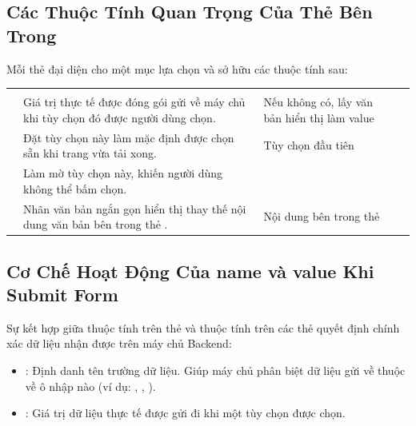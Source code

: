 \subsection{Các Thuộc Tính Quan Trọng Của Thẻ  Bên Trong}

Mỗi thẻ  đại diện cho một mục lựa chọn và sở hữu các thuộc tính sau:

\begin{prettyTableBox}
\begin{tabularx}{\linewidth}{K{2.4cm} Z K{2.2cm} Z}
 &  &  &  \\
 & Giá trị thực tế được đóng gói gửi về máy chủ khi tùy chọn đó được người dùng chọn. & Nếu không có, lấy văn bản hiển thị làm value &  \\
 & Đặt tùy chọn này làm mặc định được chọn sẵn khi trang vừa tải xong. & Tùy chọn đầu tiên &  \\
 & Làm mờ tùy chọn này, khiến người dùng không thể bấm chọn. &  &  \\
 & Nhãn văn bản ngắn gọn hiển thị thay thế nội dung văn bản bên trong thẻ . & Nội dung bên trong thẻ &  \\
\end{tabularx}
\end{prettyTableBox}

\subsection{Cơ Chế Hoạt Động Của name và value Khi Submit Form}

Sự kết hợp giữa thuộc tính  trên thẻ  và thuộc tính  trên các thẻ  quyết định chính xác dữ liệu nhận được trên máy chủ Backend:

\begin{conceptBox}
\begin{itemize}[leftmargin=1.5em, itemsep=3pt, parsep=0pt]
    \item \textbf{}: Định danh tên trường dữ liệu. Giúp máy chủ phân biệt dữ liệu gửi về thuộc về ô nhập nào (ví dụ: , , ).
    \item \textbf{}: Giá trị dữ liệu thực tế được gửi đi khi một tùy chọn được chọn.
\end{itemize}
\end{conceptBox}


